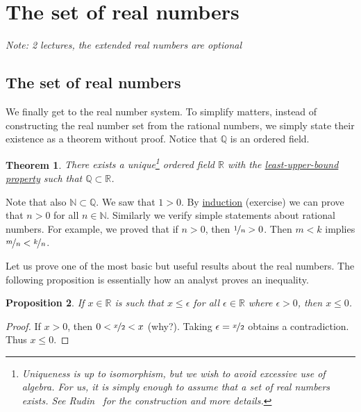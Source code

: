 \documentclass[12pt]{book}
\newcommand{\R}{{\mathbb{R}}}
\newcommand{\N}{{\mathbb{N}}}
\newcommand{\Q}{{\mathbb{Q}}}
\newcommand{\sectionnotes}[1]{\noindent \emph{Note: #1} \medskip \par}
\newcommand{\sectionnewpage}{\clearpage}
\theoremstyle{plain}
\newtheorem{thm}{Theorem}[section]
\newtheorem{prop}[thm]{Proposition}
\theoremstyle{remark}
\theoremstyle{definition}
\theoremstyle{exercise}
\theoremstyle{example}
\begin{document}

\sectionnewpage
\section{The set of real numbers} \label{sec:setofreals}

\sectionnotes{2 lectures, the extended real numbers are optional}

\subsection{The set of real numbers}

We finally get to the real number system.  To simplify matters, instead of constructing the
real number set from the rational numbers, we simply state their existence
as a theorem without proof.  Notice that $\Q$ is an ordered
field.

\begin{thm}
There exists a unique\footnote{Uniqueness is up to isomorphism, but we wish
to avoid excessive use of algebra.  For us, it is simply enough to assume
that a set of real numbers exists.  See Rudin~\cite{Rudin:baby} for the
construction and more details.}
ordered field $\R$ with the \hyperref[defn:lub]{least-upper-bound property}
such that $\Q \subset \R$.
\end{thm}

Note that also $\N \subset \Q$.  We saw that $1 > 0$.  By
\hyperref[induction:thm]{induction}
(exercise) we can prove that
$n > 0$ for all $n \in \N$.
Similarly we verify simple statements about rational numbers.
For example, we proved that if $n > 0$, then $\nicefrac{1}{n} > 0$.
Then $m < k$ implies $\nicefrac{m}{n} < \nicefrac{k}{n}$.

Let us prove one of the most basic but useful results about the real numbers.
The following proposition is essentially how an analyst proves an
inequality.

\begin{prop}
If $x \in \R$ is such that $x \leq \epsilon$ for all
$\epsilon \in \R$ where
$\epsilon > 0$, then $x \leq 0$.
\end{prop}

\begin{proof}
If $x > 0$, then $0 < \nicefrac{x}{2} < x$ (why?).  Taking
$\epsilon = \nicefrac{x}{2}$ obtains a contradiction.  Thus $x \leq 0$.
\end{proof}
\end{document}
